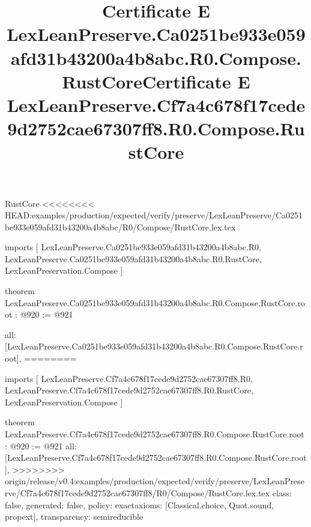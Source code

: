 \begin{lexlean}{RustCore}
<<<<<<<< HEAD:examples/production/expected/verify/preserve/LexLeanPreserve/Ca0251be933e059afd31b43200a4b8abc/R0/Compose/RustCore.lex.tex
\title{Certificate E LexLeanPreserve.Ca0251be933e059afd31b43200a4b8abc.R0.Compose.RustCore}
\begin{coremodule}
imports [
  LexLeanPreserve.Ca0251be933e059afd31b43200a4b8abc.R0,
  LexLeanPreserve.Ca0251be933e059afd31b43200a4b8abc.R0.RustCore,
  LexLeanPreservation.Compose
]

theorem LexLeanPreserve.Ca0251be933e059afd31b43200a4b8abc.R0.Compose.RustCore.root : @920 := @921 {
  all: [LexLeanPreserve.Ca0251be933e059afd31b43200a4b8abc.R0.Compose.RustCore.root],
========
\title{Certificate E LexLeanPreserve.Cf7a4c678f17cede9d2752cae67307ff8.R0.Compose.RustCore}
\begin{coremodule}
imports [
  LexLeanPreserve.Cf7a4c678f17cede9d2752cae67307ff8.R0,
  LexLeanPreserve.Cf7a4c678f17cede9d2752cae67307ff8.R0.RustCore,
  LexLeanPreservation.Compose
]

theorem LexLeanPreserve.Cf7a4c678f17cede9d2752cae67307ff8.R0.Compose.RustCore.root : @920 := @921 {
  all: [LexLeanPreserve.Cf7a4c678f17cede9d2752cae67307ff8.R0.Compose.RustCore.root],
>>>>>>>> origin/release/v0.4:examples/production/expected/verify/preserve/LexLeanPreserve/Cf7a4c678f17cede9d2752cae67307ff8/R0/Compose/RustCore.lex.tex
  class: false,
  generated: false,
  policy: exact{axioms: [Classical.choice, Quot.sound, propext]},
  transparency: semireducible
}


\end{coremodule}}
\end{coremodule}
\end{lexlean}
